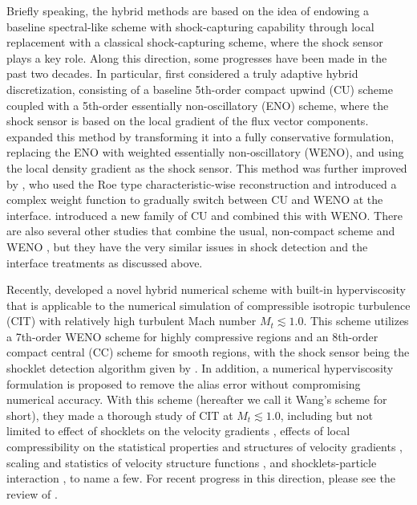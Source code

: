 \documentclass[review]{elsarticle}
\begin{document}
Briefly speaking, the hybrid methods are based on the idea of endowing a baseline spectral-like scheme with shock-capturing capability through local replacement with a classical shock-capturing scheme, where the shock sensor plays a key role. Along this direction, some progresses have been made in the past two decades. In particular, \citet{Adams1996} first considered a truly adaptive hybrid discretization, consisting of a baseline 5th-order compact upwind (CU) scheme coupled with a 5th-order essentially non-oscillatory (ENO) scheme, where the shock sensor is based on the local gradient of the flux vector components. \citet{Pirozzoli2002} expanded this method by transforming it into a fully conservative formulation, replacing the ENO with weighted essentially non-oscillatory (WENO), and using the local density gradient as the shock sensor. This method was further improved by \citet{Ren2003}, who used the Roe type characteristic-wise reconstruction and introduced a complex weight function to gradually switch between CU and WENO at the interface. \citet{Zhou2007} introduced a new family of CU and combined this with WENO. There are also several other studies that combine the usual, non-compact scheme and WENO \citep{Hill2004, Kim2005, Larsson2007}, but they have the very similar issues in shock detection and the interface treatments as discussed above.

Recently, \citet{Wang2010} developed a novel hybrid numerical scheme with built-in hyperviscosity that is applicable to the numerical simulation of compressible isotropic turbulence (CIT) with relatively high turbulent Mach number $M_t \lesssim 1.0$. This scheme utilizes a 7th-order WENO scheme for highly compressive regions and an 8th-order compact central (CC) scheme for smooth regions, with the shock sensor being the shocklet detection algorithm given by \citet{Samtaney2001}. In addition, a numerical hyperviscosity formulation is proposed to remove the alias error without compromising numerical accuracy. With this scheme (hereafter we call it Wang's scheme for short), they made a thorough study of CIT at $M_t \lesssim 1.0$, including but not limited to effect of shocklets on the velocity gradients \citep{Wang2011}, effects of local compressibility on the statistical properties and structures of velocity gradients \cite{Wang2012-jfm}, scaling and statistics of velocity structure functions \citep{Wang2012-prl}, and shocklets-particle interaction \citep{Yang2014}, to name a few. For recent progress in this direction, please see the review of \citet{Chen2015}.
\end{document}

